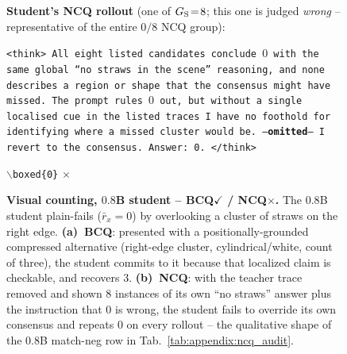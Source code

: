 \documentclass{llmxive}
\begin{document}
\begin{figure}[!p]
\begin{negcandidatebox}
\textbf{Student's NCQ rollout} (one of $G_{\rm S}\!=\!8$; this one is judged \emph{wrong} -- representative of the entire $0/8$ NCQ group):

\smallskip
\texttt{<think> All eight listed candidates conclude $0$ with the same global ``no straws in the scene'' reasoning, and none describes a region or shape that the consensus might have missed. The prompt rules $0$ out, but without a single localised cue in the listed traces I have no foothold for identifying where a missed cluster would be. ---\textbf{omitted}--- I revert to the consensus. Answer: 0. </think>}

\smallskip
\texttt{$\backslash$boxed\{0\}} \quad \ensuremath{\boldsymbol{\times}}
\end{negcandidatebox}

\caption{\textbf{Visual counting, $0.8$B student -- BCQ$\boldsymbol{\checkmark}$ / NCQ$\boldsymbol{\times}$.} The $0.8$B student plain-fails ($\bar{r}_x\!=\!0$) by overlooking a cluster of straws on the right edge. \textbf{(a)~BCQ}: presented with a positionally-grounded compressed alternative (right-edge cluster, cylindrical/white, count of three), the student commits to it because that localized claim is checkable, and recovers $3$. \textbf{(b)~NCQ}: with the teacher trace removed and shown $8$ instances of its own ``no straws'' answer plus the instruction that $0$ is wrong, the student fails to override its own consensus and repeats $\boxed{0}$ on every rollout -- the qualitative shape of the $0.8$B match-neg row in Tab.~\ref{tab:appendix:ncq_audit}.}
\label{fig:appendix:bcq_ncq_straws}
\end{figure}
\end{document}

